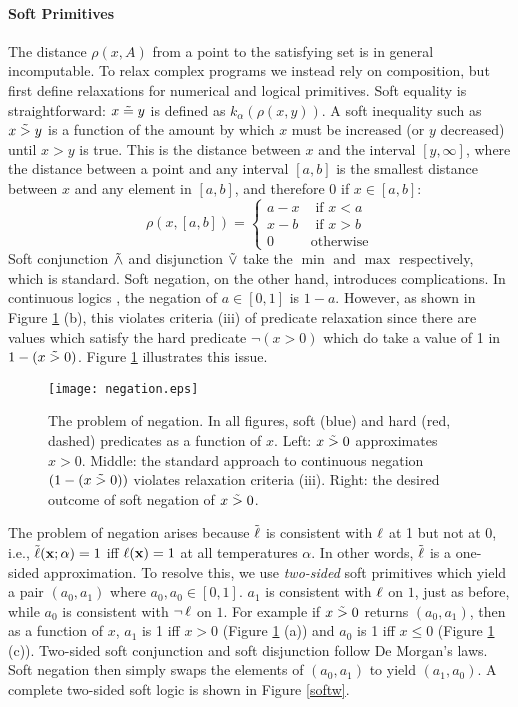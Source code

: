 \paragraph{Soft Primitives}
The distance $\rho(x, A)$ from a point to the satisfying set is in general incomputable.
To relax complex programs we instead rely on composition, but first define relaxations for numerical and logical primitives.
Soft equality is straightforward: $x \mathrel{\tilde{=}} y$ is defined as $k_\alpha(\rho(x, y))$.
A soft inequality such as $x \mathrel{\tilde{>}} y$ is a function of the amount by which $x$ must be increased (or $y$ decreased) until $x > y$ is true.
This is the distance between $x$ and the interval $[y, \infty]$, where the distance between a point and any interval $[a, b]$ is the smallest distance between $x$ and any element in $[a, b]$, and therefore 0 if $x \in [a, b]$:
\begin{equation}
\rho(x, [a, b]) =
\begin{cases}
  a - x & \text{ if } x < a\\
  x - b & \text{ if } x > b\\
  0              & \text{otherwise}
\end{cases}
\end{equation}
Soft conjunction $\mathrel{\tilde{\land}}$ and disjunction $\mathrel{\tilde{\lor}}$ take the $\min$ and $\max$ respectively, which is standard.
Soft negation, on the other hand, introduces complications.
In continuous logics \cite{kimmig2012short}, the negation of $a \in [0, 1]$ is $1 - a$.
However, as shown in Figure \ref{negationimg} (b), this violates criteria (iii) of predicate relaxation since there are values which satisfy the hard predicate $\neg(x > 0)$ which do take a value of 1 in $1 - (x \mathrel{\tilde{>}} 0)$.
Figure \ref{negationimg} illustrates this issue.


\begin{figure}
\texttt{[image: negation.eps]}
\caption{The problem of negation.  In all figures, soft (blue) and hard (red, dashed) predicates as a function of $x$.  Left: $x \mathrel{\tilde{>}} 0$ approximates $x > 0$. Middle:  the standard approach to continuous negation $(1- (x \mathrel{\tilde{>}} 0))$ violates relaxation criteria (iii). Right: the desired outcome of soft negation of $x \mathrel{\tilde{>}} 0$.}\label{negationimg}
\end{figure}


The problem of negation arises because $\mathrel{\tilde{\operatorname{\ell}}}$ is consistent with $\operatorname{\ell}$ at 1 but not at 0, i.e., $\tilde{\operatorname{\ell}}(\mathbf{x}; \alpha) = 1$ iff $\operatorname{\ell}(\mathbf{x}) = 1$ at all temperatures $\alpha$.
In other words, $\mathrel{\tilde{\operatorname{\ell}}}$ is a one-sided approximation.
To resolve this, we use \emph{two-sided} soft primitives which yield a pair $(a_0, a_1)$ where $a_0, a_0 \in [0, 1]$.
$a_1$ is consistent with $\operatorname{\ell}$ on $1$, just as before, while $a_0$ is consistent with $\neg \operatorname{\ell}$ on $1$.
For example if $x \mathrel{\tilde{>}} 0$ returns $(a_0, a_1)$, then as a function of $x$, $a_1$ is 1 iff $x > 0$ (Figure \ref{negationimg} (a)) and $a_0$ is 1 iff $x \leq 0$ (Figure \ref{negationimg} (c)).
Two-sided soft conjunction and soft disjunction follow De Morgan's laws.
Soft negation then simply swaps the elements of $(a_0, a_1)$ to yield $(a_1, a_0)$.
A complete two-sided soft logic is shown in Figure \ref{softw}.

